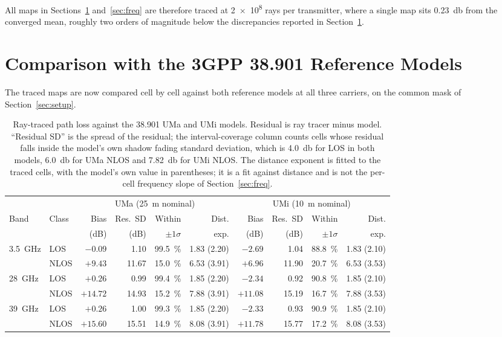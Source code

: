 \documentclass[conference]{IEEEtran}
\begin{document}
All maps in Sections~\ref{sec:umi} and~\ref{sec:freq} are therefore traced at
\num{2e8} rays per transmitter, where a single map sits
\SI{0.23}{\decibel} from the converged mean, roughly two orders of magnitude
below the discrepancies reported in Section~\ref{sec:umi}.

\section{Comparison with the 3GPP 38.901 Reference Models}
\label{sec:umi}

The traced maps are now compared cell by cell against both reference models at
all three carriers, on the common mask of Section~\ref{sec:setup}.


\begin{table}[t]
\caption{Ray-traced path loss against the 38.901 UMa and UMi models.
Residual is ray tracer minus model. ``Residual SD'' is the spread of the
residual; the interval-coverage column counts cells whose residual falls
inside the model's own shadow fading standard deviation, which is
\SI{4.0}{\decibel} for LOS in both models, \SI{6.0}{\decibel} for UMa NLOS
and \SI{7.82}{\decibel} for UMi NLOS. The distance exponent is fitted to the
traced cells, with the model's own value in parentheses; it is a fit against
distance and is not the per-cell frequency slope of
Section~\ref{sec:freq}.}
\label{tab:umi}
\centering
\begin{tabular}{llrrrrrrrr}
\toprule
& & \multicolumn{4}{c}{UMa (\SI{25}{\metre} nominal)} & \multicolumn{4}{c}{UMi (\SI{10}{\metre} nominal)} \\
\cmidrule(lr){3-6}\cmidrule(lr){7-10}
Band & Class & Bias & Res.\ SD & Within & Dist. & Bias & Res.\ SD & Within & Dist. \\
     &       & (dB) & (dB) & $\pm 1\sigma$ & exp. & (dB) & (dB) & $\pm 1\sigma$ & exp. \\
\midrule
\SI{3.5}{\giga\hertz} & LOS  & $-0.09$ & 1.10 & \SI{99.5}{\percent} & 1.83 (2.20) & $-2.69$ & 1.04 & \SI{88.8}{\percent} & 1.83 (2.10) \\
                      & NLOS & $+9.43$ & 11.67 & \SI{15.0}{\percent} & 6.53 (3.91) & $+6.96$ & 11.90 & \SI{20.7}{\percent} & 6.53 (3.53) \\
\SI{28}{\giga\hertz}  & LOS  & $+0.26$ & 0.99 & \SI{99.4}{\percent} & 1.85 (2.20) & $-2.34$ & 0.92 & \SI{90.8}{\percent} & 1.85 (2.10) \\
                      & NLOS & $+14.72$ & 14.93 & \SI{15.2}{\percent} & 7.88 (3.91) & $+11.08$ & 15.19 & \SI{16.7}{\percent} & 7.88 (3.53) \\
\SI{39}{\giga\hertz}  & LOS  & $+0.26$ & 1.00 & \SI{99.3}{\percent} & 1.85 (2.20) & $-2.33$ & 0.93 & \SI{90.9}{\percent} & 1.85 (2.10) \\
                      & NLOS & $+15.60$ & 15.51 & \SI{14.9}{\percent} & 8.08 (3.91) & $+11.78$ & 15.77 & \SI{17.2}{\percent} & 8.08 (3.53) \\
\bottomrule
\end{tabular}
\end{table}
\end{document}
